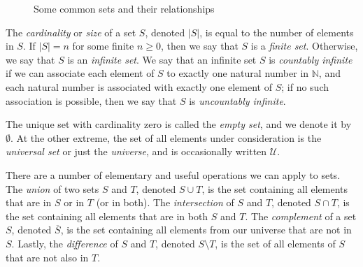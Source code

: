 \begin{figure}[t]
\centering
{}
\caption{Some common sets and their relationships}
\label{fig:commonsets}
\end{figure}

The \emph{cardinality} or \emph{size} of a set $S$, denoted $|S|$, is equal to the number of elements in $S$. If $|S| = n$ for some finite $n \geq 0$, then we say that $S$ is a \emph{finite set}. Otherwise, we say that $S$ is an \emph{infinite set}. We say that an infinite set $S$ is \emph{countably infinite} if we can associate each element of $S$ to exactly one natural number in $\mathbb{N}$, and each natural number is associated with exactly one element of $S$; if no such association is possible, then we say that $S$ is \emph{uncountably infinite}.

The unique set with cardinality zero is called the \emph{empty set}, and we denote it by $\emptyset$. At the other extreme, the set of all elements under consideration is the \emph{universal set} or just the \emph{universe}, and is occasionally written $\mathcal{U}$.

There are a number of elementary and useful operations we can apply to sets. The \emph{union} of two sets $S$ and $T$, denoted $S \cup T$, is the set containing all elements that are in $S$ or in $T$ (or in both). The \emph{intersection} of $S$ and $T$, denoted $S \cap T$, is the set containing all elements that are in both $S$ and $T$. The \emph{complement} of a set $S$, denoted $\overline{S}$, is the set containing all elements from our universe that are not in $S$. Lastly, the \emph{difference} of $S$ and $T$, denoted $S \setminus T$, is the set of all elements of $S$ that are not also in $T$.

